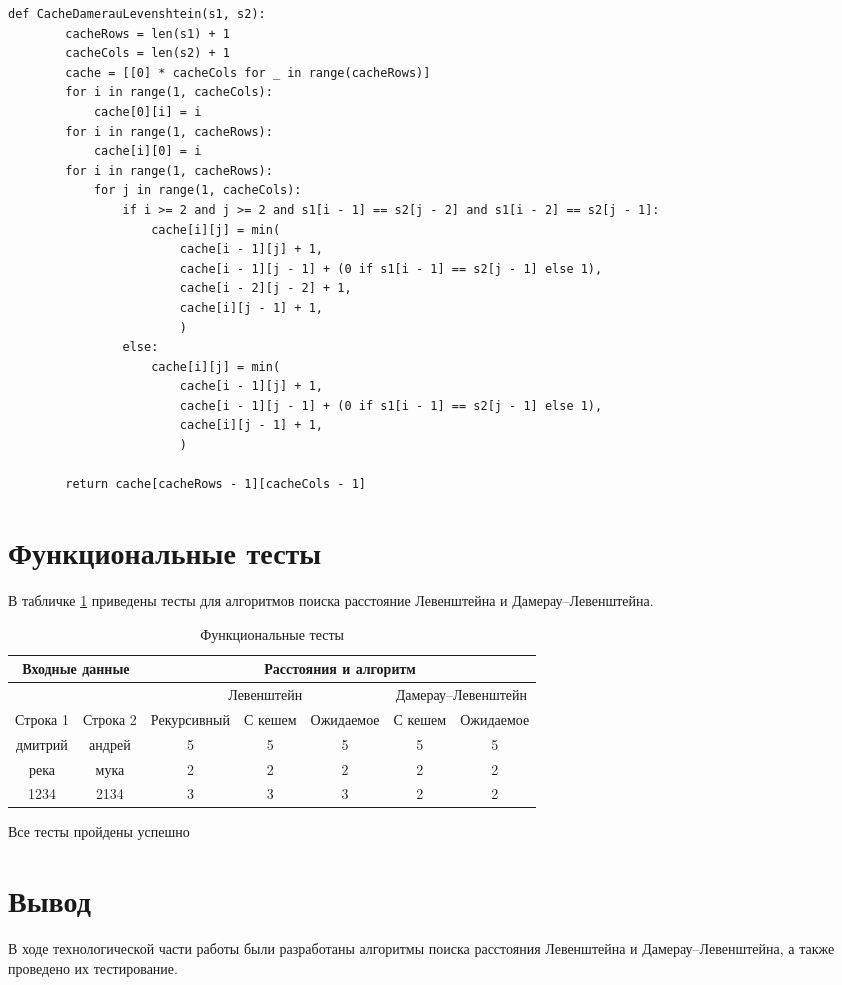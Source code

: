 \begin{lstlisting}[label=cache-damerau-levenshtein,caption={Итерационный алгоритм нахождения расстояния Дамерау-Левенштейна с кешэм}]
	def CacheDamerauLevenshtein(s1, s2):
		cacheRows = len(s1) + 1
		cacheCols = len(s2) + 1
		cache = [[0] * cacheCols for _ in range(cacheRows)]
		for i in range(1, cacheCols):
			cache[0][i] = i
		for i in range(1, cacheRows):
			cache[i][0] = i
		for i in range(1, cacheRows):
			for j in range(1, cacheCols):
				if i >= 2 and j >= 2 and s1[i - 1] == s2[j - 2] and s1[i - 2] == s2[j - 1]:
					cache[i][j] = min(
						cache[i - 1][j] + 1,
						cache[i - 1][j - 1] + (0 if s1[i - 1] == s2[j - 1] else 1),
						cache[i - 2][j - 2] + 1,
						cache[i][j - 1] + 1,
						)
				else:
					cache[i][j] = min(
						cache[i - 1][j] + 1,
						cache[i - 1][j - 1] + (0 if s1[i - 1] == s2[j - 1] else 1),
						cache[i][j - 1] + 1,
						)
		
		return cache[cacheRows - 1][cacheCols - 1]
\end{lstlisting}

\section{Функциональные тесты}

В табличке \ref{tbl:func_tests} приведены тесты для алгоритмов поиска расстояние Левенштейна и Дамерау–Левенштейна.

\begin{table}[ht]
	\small
	\begin{center}
		\begin{threeparttable}
			\caption{Функциональные тесты}
			\label{tbl:func_tests}
			\begin{tabular}{|c|c|c|c|c|c|c|}
				\hline
				\multicolumn{2}{|c|}{\bfseries Входные данные}
				& \multicolumn{5}{c|}{\bfseries Расстояния и алгоритм} \\ 
				\hline
				&
				&
				\multicolumn{3}{c|}{Левенштейн} & \multicolumn{2}{c|}{Дамерау–Левенштейн} \\ \cline{3-7}
				Строка 1 & Строка 2 & Рекурсивный & С кешем &  Ожидаемое & С кешем & Ожидаемое \\
				\hline
				дмитрий & андрей & 5 & 5 & 5 & 5 & 5 \\
				\hline
				река & мука & 2 & 2 & 2 & 2 & 2 \\
				\hline
				1234 & 2134 & 3 & 3 & 3 & 2 & 2 \\
				\hline
			\end{tabular}	
		\end{threeparttable}
	\end{center}
\end{table}

Все тесты пройдены успешно

\section*{Вывод}

В ходе технологической части работы были разработаны алгоритмы поиска расстояния Левенштейна и Дамерау–Левенштейна, а также проведено их тестирование.

\clearpage

